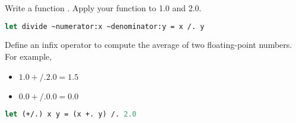 \problem[divide]
Write a function . Apply your function to 1.0 and 2.0.

\begin{lstlisting}[language=OCaml]
let divide ~numerator:x ~denominator:y = x /. y
\end{lstlisting}

\problem[average]
Define an infix operator  to compute the average of two floating-point numbers. For example,
\begin{itemize}
  \item $1.0 +/. 2.0 = 1.5$
  \item $0.0 +/. 0.0 = 0.0$
\end{itemize}

\begin{lstlisting}[language=OCaml]
let (+/.) x y = (x +. y) /. 2.0
\end{lstlisting}